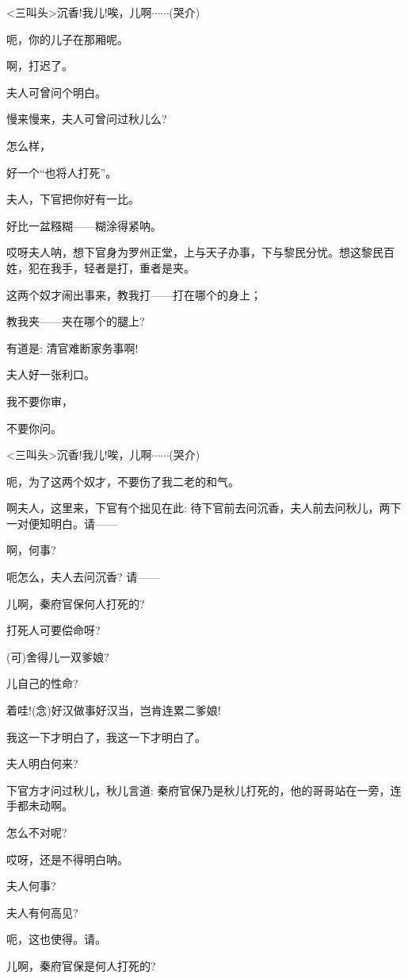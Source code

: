 {\textless{}三叫头\textgreater{}沉香!我儿!唉，儿啊$\cdots{}\cdots{}$(哭介)}

{呃，你的儿子在那厢呢。}

{啊，打迟了。}

{夫人可曾问个明白。}

{慢来慢来，夫人可曾问过秋儿么?}

{怎么样，}

{好一个``也将人打死''。}

{夫人，下官把你好有一比。}

{好比一盆糨糊------糊涂得紧呐。}

{哎呀夫人呐，想下官身为罗州正堂，上与天子办事，下与黎民分忧。想这黎民百姓，犯在我手，轻者是打，重者是夹。}

{这两个奴才闹出事来，教我打------打在哪个的身上；}

{教我夹------夹在哪个的腿上?}

{有道是: 清官难断家务事啊!}

{夫人好一张利口。}

{我不要你审，}

{不要你问。}

{\textless{}三叫头\textgreater{}沉香!我儿!唉，儿啊$\cdots{}\cdots{}$(哭介)}

{呃，为了这两个奴才，不要伤了我二老的和气。}

{啊夫人，这里来，下官有个拙见在此: 待下官前去问沉香，夫人前去问秋儿，两下一对便知明白。请------}

{啊，何事?}

{呃怎么，夫人去问沉香? 请------}

{儿啊，秦府官保何人打死的?}

{打死人可要偿命呀?}

{(可)舍得儿一双爹娘?}

{儿自己的性命?}

{着哇!({\akai 念})好汉做事好汉当，岂肯连累二爹娘!}

{我这一下才明白了，我这一下才明白了。}

{夫人明白何来?}

{下官方才问过秋儿，秋儿言道: 秦府官保乃是秋儿打死的，他的哥哥站在一旁，连手都未动啊。}

{怎么不对呢?}

{哎呀，还是不得明白呐。}

{夫人何事?}

{夫人有何高见?}

{呃，这也使得。请。}

{儿啊，秦府官保是何人打死的?}

